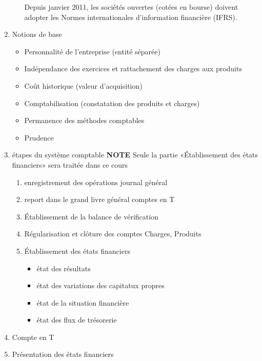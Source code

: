\documentclass[11pt]{article}
\begin{document}
\begin{enumerate}
\begin{enumerate}
Depuis janvier 2011, les sociétés ouvertes (cotées en bourse) doivent adopter
les Normes internationales d'information financière (IFRS).
\end{enumerate}

\item Notions de base
\label{sec:orgb396265}
\begin{itemize}
\item Personnalité de l’entreprise (entité séparée)
\item Indépendance des exercices et rattachement des
charges aux produits
\item Coût historique (valeur d’acquisition)
\item Comptabilisation (constatation des produits et charges)
\item Permanence des méthodes comptables
\item Prudence
\end{itemize}

\item étapes du système comptable
\label{sec:org061f774}
\textbf{NOTE} Seule la partie «Établissement des états financiers» sera traitée dans ce cours
\begin{enumerate}
\item enregistrement des opérations
\label{sec:org2570c40}
journal général

\item report dans le grand livre général
\label{sec:org7234684}
comptes en T

\item Établissement de la balance de vérification
\label{sec:orge017458}

\item Régularisation et clôture des comptes
\label{sec:org60d90d1}
Charges, Produits

\item Établissement des états financiers
\label{sec:org2217ebf}
\begin{itemize}
\item état des résultats
\item état des variations des capitatux propres
\item état de la situation financière
\item état des flux de trésorerie
\end{itemize}
\end{enumerate}

\item Compte en T
\label{sec:orgb98319b}
\item Présentation des états financiers
\label{sec:orgefc13ef}


\end{enumerate}
\end{document}
